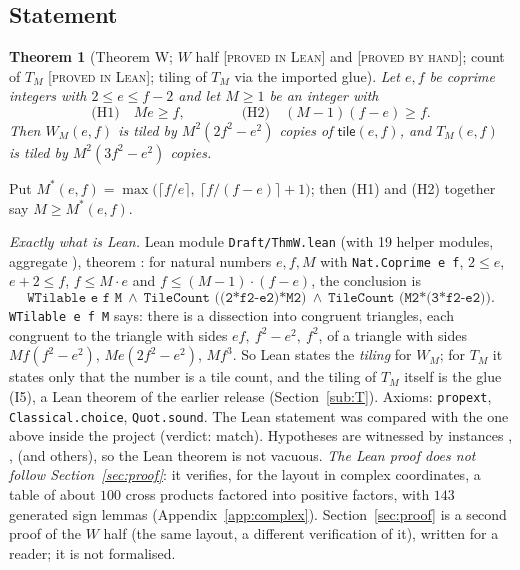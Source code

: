 \documentclass[11pt,reqno]{amsart}
\theoremstyle{plain}
\newtheorem{theorem}{Theorem}[section]
\theoremstyle{definition}
\newcommand{\lab}[1]{\textup{[\textsc{#1}]}}
\newcommand{\PL}{\lab{proved in Lean}}
\newcommand{\PH}{\lab{proved by hand}}
\newcommand{\tile}{\mathsf{tile}}
\begin{document}
\subsection{Statement}
\begin{theorem}[Theorem W; $W$ half \PL{} and \PH{}; count of $T_M$ \PL{}; tiling of $T_M$ via the imported glue]\label{thm:W}
Let $e,f$ be coprime integers with $2\le e\le f-2$ and let $M\ge1$ be an integer with
\[
\text{(H1)}\quad Me\ge f,\qquad\qquad \text{(H2)}\quad (M-1)(f-e)\ge f .
\]
Then $W_M(e,f)$ is tiled by $M^2(2f^2-e^2)$ copies of $\tile(e,f)$, and $T_M(e,f)$ is tiled by $M^2(3f^2-e^2)$ copies.
\end{theorem}
Put $M^*(e,f)=\max\bigl(\lceil f/e\rceil,\ \lceil f/(f-e)\rceil+1\bigr)$; then (H1) and (H2) together say $M\ge M^*(e,f)$.
\smallskip

\emph{Exactly what is Lean.} Lean module \texttt{Draft/ThmW.lean} (with 19 helper modules, aggregate ), theorem : for natural numbers $e,f,M$ with \texttt{Nat.Coprime e f}, $2\le e$, $e+2\le f$, $f\le M\cdot e$ and $f\le (M-1)\cdot(f-e)$, the conclusion is
\[\texttt{WTilable e f M} \ \wedge\ \texttt{TileCount ((2*f\^{}2-e\^{}2)*M\^{}2)}\ \wedge\ \texttt{TileCount (M\^{}2*(3*f\^{}2-e\^{}2))}.\]
\texttt{WTilable e f M} says: there is a dissection into congruent triangles, each congruent to the triangle with sides $ef,\ f^2-e^2,\ f^2$, of a triangle with sides $Mf(f^2-e^2)$, $Me(2f^2-e^2)$, $Mf^3$. So Lean states the \emph{tiling} for $W_M$; for $T_M$ it states only that the number is a tile count, and the tiling of $T_M$ itself is the glue (I5), a Lean theorem of the earlier release (Section~\ref{sub:T}). Axioms: \texttt{propext}, \texttt{Classical.choice}, \texttt{Quot.sound}. The Lean statement was compared with the one above inside the project (verdict: match). Hypotheses are witnessed by instances , ,  (and others), so the Lean theorem is not vacuous.
\emph{The Lean proof does not follow Section~\ref{sec:proof}}: it verifies, for the layout in complex coordinates, a table of about $100$ cross products factored into positive factors, with $143$ generated sign lemmas (Appendix~\ref{app:complex}). Section~\ref{sec:proof} is a second proof of the $W$ half (the same layout, a different verification of it), written for a reader; it is not formalised.
\end{document}
